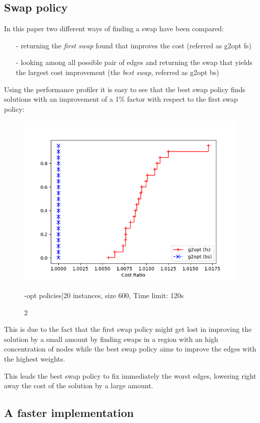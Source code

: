 \subsection{Swap policy}

In this paper two different ways of finding a swap have been compared:

\begin{enumerate}
    \item[-] returning the \textit{first swap} found that improves the cost (referred as g2opt fs)
    \item[-] looking among all possible pair of edges and returning the swap that yields the largest cost improvement (the \textit{best swap}, referred as g2opt bs)
\end{enumerate}

Using the performance profiler it is easy to see that the best swap policy finds solutions with an improvement of a 1\% factor with respect to the first swap policy:

\begin{figure}[h]
    \centering
    \includegraphics*[width=.6\textwidth]{../plots/perfprof_g2opt.png}
    \captionsetup{labelformat=empty}
    \caption*2-opt policies]{20 instances, size 600, Time limit: 120s}
    \label{fig:eree}
\end{figure}

This is due to the fact that the first swap policy might get lost in improving the solution by a small amount by finding swaps in a region with an high concentration of nodes while the best swap policy aims to improve the edges with the highest weights.

This leads the best swap policy to fix immediately the worst edges, lowering right away the cost of the solution by a large amount.

\subsection{A faster implementation}

